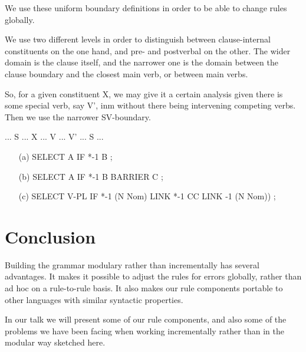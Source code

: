   \documentclass[a4paper,english]{article}
\begin{document}
We use these uniform boundary definitions in order to be able to change rules globally.%

We use two different levels in order to distinguish between clause-internal constituents on the one hand, and pre- and postverbal on the other. The wider domain is the clause itself, and the narrower one is the domain between the clause boundary and the closest main verb, or between main verbs.%

So, for a given constituent X, we may give it a certain analysis given there is some special verb, say V', inm without there being intervening competing verbs. Then we use the narrower SV-boundary.%

\begin{example}\label{svx}
... S ... X ... V ... V' ... S ...
\end{example}


\begin{example}\label{ped}
\begin{itemize}
\item[(a)] SELECT A IF *-1 B ;
\item[(b)] SELECT A IF *-1 B BARRIER C ;
\item[(c)] SELECT V-PL IF *-1 (N Nom) LINK *-1 CC LINK -1 (N Nom)) ;
\end{itemize}
\end{example}



\section{Conclusion}

Building the grammar modulary rather than incrementally has several advantages. It makes it possible to adjust the rules for errors globally, rather than ad hoc on a rule-to-rule basis. It also makes our rule components portable to other languages with similar syntactic properties.%

In our talk we will present some of our rule components, and also some of the problems we have been facing when working incrementally rather than in the modular way sketched here.%

       

%
%
\end{document}

